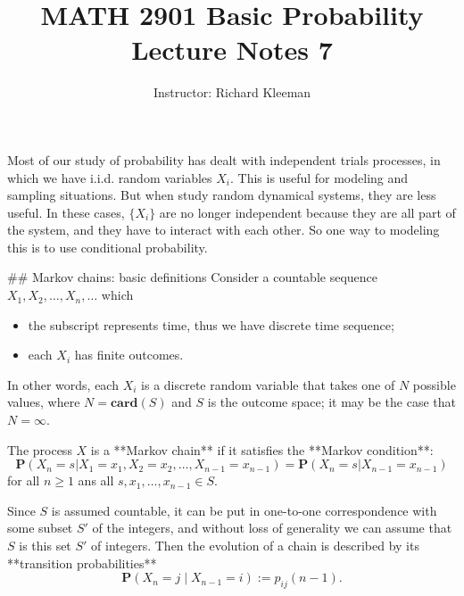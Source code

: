 


\title{MATH 2901 Basic Probability Lecture Notes 7}
\author{Instructor: Richard Kleeman}
\date{}
\maketitle


Most of our study of probability has dealt with independent trials processes, in which we have i.i.d. random variables $X_i$. This is useful for modeling and sampling situations. But when study random dynamical systems, they are less useful. In these cases, $\{X_i\}$ are no longer independent because they are all part of the system, and they have to interact with each other. So one way to modeling this is to use conditional probability. 

## Markov chains: basic definitions
Consider a countable sequence $X_1, X_2, \dots, X_n, \dots$ which 
\begin{itemize}
    \item the subscript represents time, thus we have discrete time sequence;
    \item each $X_i$ has finite outcomes.
\end{itemize}
In other words, each $X_i$ is a discrete random variable that takes one of $N$ possible values, where 
$N = \mathbf{card}(S)$ and $S$ is the outcome space; it may be the case that $N = \infty$.

\begin{definition}
The process $X$ is a **Markov chain** if it satisfies the **Markov condition**:
\begin{equation*}
    \mathbf{P}\left(X_{n}=s | X_{1}=x_{1}, X_{2}=x_{2}, \ldots, X_{n-1}=x_{n-1}\right)=\mathbf{P}\left(X_{n}=s | X_{n-1}=x_{n-1}\right)
\end{equation*}
for all $n\geq 1$ ans all $s, x_1, \dots, x_{n-1} \in S$.
\end{definition}
Since $S$ is assumed countable, it can be put in one-to-one correspondence with some subset $S'$ of the integers, and without loss of generality we can assume that $S$ is this set $S'$ of integers. Then the evolution of a chain is described by its **transition probabilities** 
\begin{equation}
    \label{eq:7.1}
    \tag{7-1}
    \mathbf{P}(X_{n} = j \;\vert\; X_{n-1} = i) := p_{ij}(n-1).
\end{equation}


